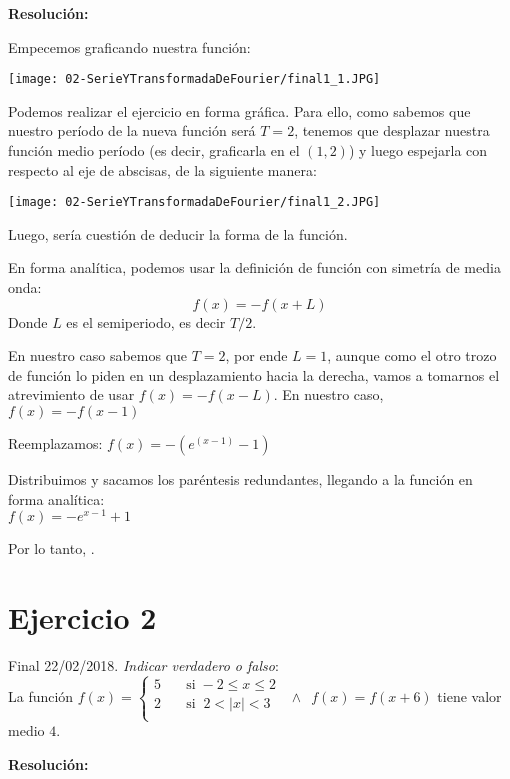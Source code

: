 \documentclass[11pt]{article}
\begin{document}
	\textbf{Resolución:}
	
	Empecemos graficando nuestra función:\\
	\begin{center}
		\texttt{[image: 02-SerieYTransformadaDeFourier/final1\_1.JPG]}
	\end{center}

	Podemos realizar el ejercicio en forma gráfica. Para ello, como sabemos que nuestro período de la nueva función será $T=2$, tenemos que desplazar nuestra función medio período (es decir, graficarla en el $(1,2)$) y luego espejarla con respecto al eje de abscisas, de la siguiente manera:\\
	
	\begin{center}
		\texttt{[image: 02-SerieYTransformadaDeFourier/final1\_2.JPG]}
	\end{center}

	Luego, sería cuestión de deducir la forma de la función.
	
	En forma analítica, podemos usar la definición de función con simetría de media onda:	
	$$f(x)=-f(x+L)$$ Donde $L$ es el semiperiodo, es decir $T/2$.
	
	En nuestro caso sabemos que $T=2$, por ende $L=1$, aunque como el otro trozo de función lo piden en un desplazamiento hacia la derecha, vamos a tomarnos el atrevimiento de usar $f(x)=-f(x-L)$. En nuestro caso, $f(x)=-f(x-1)$
	
	Reemplazamos: $f(x)=-\left(e^{(x-1)}-1\right)$
	
	Distribuimos y sacamos los paréntesis redundantes, llegando a la función en forma analítica:\\
	$\boxed{f(x)=-e^{x-1}+1}$
	
	Por lo tanto, .
	\section{Ejercicio 2}
	Final 22/02/2018. \textit{Indicar verdadero o falso}:\\
	La función $   
	f(x) = 
	\begin{cases}
	5 &\quad\text{si}\;-2\leq x \leq 2\\
	2 &\quad\text{si}\;\;2< |x| < 3 \\
	\end{cases}
	\enspace\wedge\enspace
	f(x)=f(x+6)
	$
	tiene valor medio $4$.
	
	\textbf{Resolución:}
	
\end{document}

